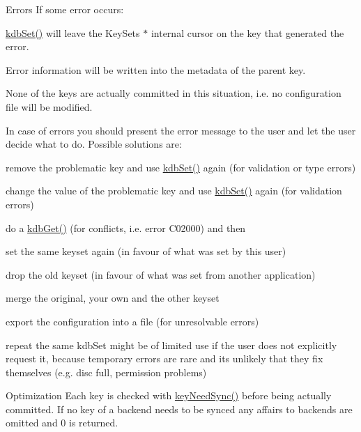 \begin{DoxyParagraph}{Errors}
If some error occurs\+:
\begin{DoxyItemize}
\item \hyperlink{group__kdb_ga11436b058408f83d303ca5e996832bcf}{kdb\+Set()} will leave the Key\+Set\textquotesingle{}s $\ast$ internal cursor on the key that generated the error.
\item Error information will be written into the metadata of the parent key.
\item None of the keys are actually committed in this situation, i.\+e. no configuration file will be modified.
\end{DoxyItemize}
\end{DoxyParagraph}
In case of errors you should present the error message to the user and let the user decide what to do. Possible solutions are\+:
\begin{DoxyItemize}
\item remove the problematic key and use \hyperlink{group__kdb_ga11436b058408f83d303ca5e996832bcf}{kdb\+Set()} again (for validation or type errors)
\item change the value of the problematic key and use \hyperlink{group__kdb_ga11436b058408f83d303ca5e996832bcf}{kdb\+Set()} again (for validation errors)
\item do a \hyperlink{group__kdb_ga28e385fd9cb7ccfe0b2f1ed2f62453a1}{kdb\+Get()} (for conflicts, i.\+e. error C02000) and then
\begin{DoxyItemize}
\item set the same keyset again (in favour of what was set by this user)
\item drop the old keyset (in favour of what was set from another application)
\item merge the original, your own and the other keyset
\end{DoxyItemize}
\item export the configuration into a file (for unresolvable errors)
\item repeat the same kdb\+Set might be of limited use if the user does not explicitly request it, because temporary errors are rare and its unlikely that they fix themselves (e.\+g. disc full, permission problems)
\end{DoxyItemize}

\begin{DoxyParagraph}{Optimization}
Each key is checked with \hyperlink{group__keytest_gaf247df0de7aca04b32ef80e39ef12950}{key\+Need\+Sync()} before being actually committed. If no key of a backend needs to be synced any affairs to backends are omitted and 0 is returned.
\end{DoxyParagraph}

